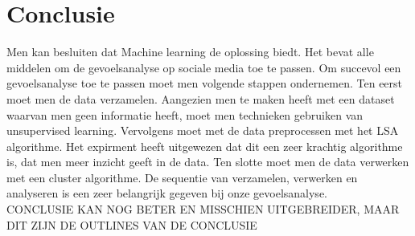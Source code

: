 \chapter{Conclusie}\label{Conclusie}

Men kan besluiten dat Machine learning de oplossing biedt. Het bevat alle middelen om de gevoelsanalyse op sociale media toe te passen. Om succevol een gevoelsanalyse toe te passen moet men volgende stappen ondernemen. Ten eerst moet men de data verzamelen. Aangezien men te maken heeft met een dataset waarvan men geen informatie heeft, moet men technieken gebruiken van unsupervised learning. Vervolgens moet met de data preprocessen met het LSA algorithme. Het expirment heeft uitgewezen dat dit een zeer krachtig algorithme is, dat men meer inzicht geeft in de data. Ten slotte moet men de data verwerken met een cluster algorithme. De sequentie van verzamelen, verwerken en analyseren is een zeer belangrijk gegeven bij onze gevoelsanalyse.
\\
CONCLUSIE KAN NOG BETER EN MISSCHIEN UITGEBREIDER, MAAR DIT ZIJN DE OUTLINES VAN DE CONCLUSIE
\\
